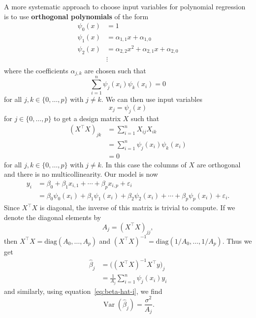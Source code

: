 \documentclass[
  a4paper,
]{article}
\theoremstyle{definition}
\theoremstyle{definition}
\theoremstyle{definition}
\theoremstyle{definition}
\theoremstyle{remark}
\begin{document}
A more systematic approach to choose input variables for polynomial regression
is to use \textbf{orthogonal polynomials} of the form
\begin{align*}
  \psi_0(x) &=  1 \\
  \psi_1(x) &=  \alpha_{1,1} x + \alpha_{1,0} \\
  \psi_2(x) &=  \alpha_{2,2} x^2 + \alpha_{2,1} x + \alpha_{2,0} \\
  &\vdots \\
\end{align*}
where the coefficients \(\alpha_{j,k}\) are chosen such that
\begin{equation*}
  \sum_{i=1}^n \psi_j(x_i) \psi_k(x_i)
  = 0
\end{equation*}
for all \(j, k \in \{0, \ldots, p\}\) with \(j \neq k\). We can then use
input variables
\begin{equation*}
  x_j = \psi_j(x)
\end{equation*}
for \(j \in \{0, \ldots, p\}\) to get a design matrix \(X\) such that
\begin{align*}
  (X^\top X)_{jk}
  &= \sum_{i=1}^n X_{ij} X_{ik} \\
  &= \sum_{i=1}^n \psi_j(x_i) \psi_k(x_i) \\
  &= 0
\end{align*}
for all \(j, k \in \{0, \ldots, p\}\) with \(j \neq k\). In this case the columns
of \(X\) are orthogonal and there is no multicollinearity.
Our model is now
\begin{align*}
  y_i
  &= \beta_0 + \beta_1 x_{i,1} + \cdots + \beta_p x_{i,p} + \varepsilon_i \\
  &= \beta_0 \psi_0(x_i) + \beta_1 \psi_1(x_i) + \beta_2 \psi_2(x_i) + \cdots + \beta_p \psi_p(x_i) + \varepsilon_i.
\end{align*}
Since \(X^\top X\) is diagonal, the inverse of this matrix is trivial to
compute. If we denote the diagonal elements by
\begin{equation*}
  A_j
  = (X^\top X)_{jj},
\end{equation*}
then \(X^\top X = \mathrm{diag}(A_0, \ldots, A_p)\) and
\((X^\top X)^{-1} = \mathrm{diag}(1/A_0, \ldots, 1/A_p)\). Thus we get
\begin{align*}
  \hat\beta_j
  &= \bigl( (X^\top X)^{-1} X^\top y \bigr)_j \\
  &= \frac{1}{A_j} \sum_{i=1}^n \psi_j(x_i) y_i
\end{align*}
and similarly, using equation~\eqref{eq:beta-hat-i}, we find
\begin{equation*}
  \mathop{\mathrm{Var}}( \hat\beta_j )
  = \frac{\sigma^2}{A_j}.
\end{equation*}
\end{document}
